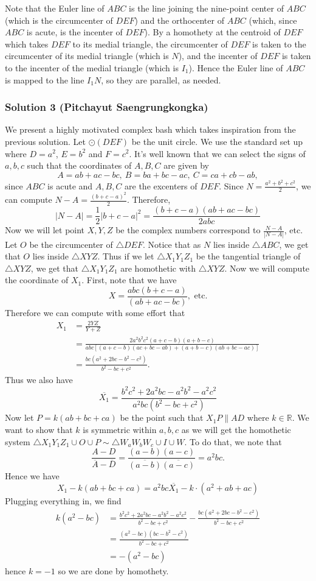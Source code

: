 Note that the Euler line of $ABC$ is the line joining the nine-point center of $ABC$ (which is the circumcenter of $DEF$) and the orthocenter of $ABC$ (which, since $ABC$ is acute, is the incenter of $DEF$). By a homothety at the centroid of $DEF$ which takes $DEF$ to its medial triangle, the circumcenter of $DEF$ is taken to the circumcenter of its medial triangle (which is $N$), and the incenter of $DEF$ is taken to the incenter of the medial triangle (which is $I_1$). Hence the Euler line of $ABC$ is mapped to the line $I_1N$, so they are parallel, as needed.
\subsubsection{Solution 3 (Pitchayut Saengrungkongka)}
\newcommand{\ol}[1]{\overline{#1}}%
We present a highly motivated complex bash which takes inspiration from the previous solution. Let $\odot(DEF)$ be the unit circle. We use the standard set up where $D = a^2$, $E=b^2$ and $F=c^2$. It's well known that we can select the signs of $a,b,c$ such that the coordinates of $A,B,C$ are given by
$$A = ab+ac-bc,\ B=ba+bc-ac,\ C=ca+cb-ab,$$
since $ABC$ is acute and $A, B, C$ are the excenters of $DEF$.
Since $N=\tfrac{a^2+b^2+c^2}{2}$, we can compute $N-A = \tfrac{(b+c-a)^2}{2}$. Therefore,
$$|N-A|=\frac 12 |b+c-a|^2 = \frac{(b+c-a)(ab+ac-bc)}{2abc}$$
Now we will let point $X,Y,Z$ be the complex numbers correspond to $\tfrac{N-A}{|N-A|}$, etc. Let $O$ be the circumcenter of $\triangle DEF$. Notice that as $N$ lies inside $\triangle ABC$, we get that $O$ lies inside $\triangle XYZ$. Thus if we let $\triangle X_1Y_1Z_1$ be the tangential triangle of $\triangle XYZ$, we get that $\triangle X_1Y_1Z_1$ are homothetic with $\triangle XYZ$.
\nl Now we will compute the coordinate of $X_1$. First, note that we have
$$X = \frac{abc(b+c-a)}{(ab+ac-bc)}, \text{ etc.}$$
Therefore we can compute with some effort that
\begin{align*}
    X_1 &= \frac{2YZ}{Y+Z} \\
    &= \frac{2a^2b^2c^2(a+c-b)(a+b-c)}{abc[(a+c-b)(ac+bc-ab)+(a+b-c)(ab+bc-ac)]} \\
    &= \frac{bc(a^2+2bc-b^2-c^2)}{b^2-bc+c^2}.
\end{align*}
Thus we also have
$$\ol{X_1} = \frac{b^2c^2+2a^2bc-a^2b^2-a^2c^2}{a^2bc(b^2-bc+c^2)}$$
Now let $P=k(ab+bc+ca)$ be the point such that $X_1P\parallel AD$ where $k\in\mathbb{R}$. We want to show that $k$ is symmetric within $a,b,c$ as we will get the homothetic system $\triangle X_1Y_1Z_1\cup O\cup P\sim\triangle W_aW_bW_c\cup I\cup W$. To do that, we note that
$$\frac{A-D}{\ol{A}-\ol{D}} = \frac{(a-b)(a-c)}{\ol{(a-b)}\ol{(a-c)}} = a^2bc.$$
Hence we have
$$X_1 - k(ab+bc+ca) = a^2bc\ol{X_1} - k\cdot (a^2+ab+ac)$$
Plugging everything in, we find
\begin{align*}
    k(a^2-bc) &= \frac{b^2c^2+2a^2bc-a^2b^2-a^2c^2}{b^2-bc+c^2} - \frac{bc(a^2+2bc-b^2-c^2)}{b^2-bc+c^2} \\
    &= \frac{(a^2-bc)(bc-b^2-c^2)}{b^2-bc+c^2} \\
    &= -(a^2-bc)
\end{align*}
hence $k=-1$ so we are done by homothety.
